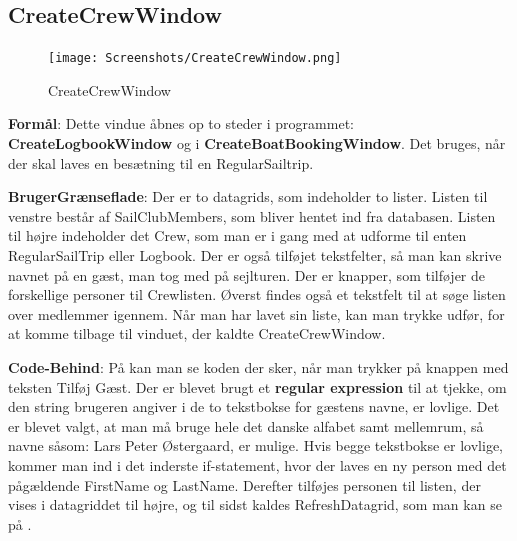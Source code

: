 \subsection{CreateCrewWindow}

\begin{figure}
    \label{img:login_interface}
    \vspace{-20pt}
    \begin{center}
        \texttt{[image: Screenshots/CreateCrewWindow.png]}
    \end{center}
    \vspace{-20pt}
    \caption{CreateCrewWindow}
    \vspace{-30pt}
\end{figure}

\textbf{Formål}: Dette vindue åbnes op to steder i programmet: \textbf{CreateLogbookWindow} og i \textbf{CreateBoatBookingWindow}. Det bruges, når der skal laves en besætning til en RegularSailtrip.  

\textbf{BrugerGrænseflade}: Der er to datagrids, som indeholder to lister. Listen til venstre består af SailClubMembers, som bliver hentet ind fra databasen. Listen til højre indeholder det Crew, som man er i gang med at udforme til enten RegularSailTrip eller Logbook. Der er også tilføjet tekstfelter, så man kan skrive navnet på en gæst, man tog med på sejlturen. Der er knapper, som tilføjer de forskellige personer til Crewlisten. Øverst findes også et tekstfelt til at søge listen over medlemmer igennem. Når man har lavet sin liste, kan man trykke udfør, for at komme tilbage til vinduet, der kaldte CreateCrewWindow.

\textbf{Code-Behind}: 
På  kan man se koden der sker, når man trykker på knappen med teksten Tilføj Gæst.
Der er blevet brugt et \textbf{regular expression} til at tjekke, om den string brugeren angiver i de to tekstbokse for gæstens navne, er lovlige. 
Det er blevet valgt, at man må bruge hele det danske alfabet samt mellemrum, så navne såsom: Lars Peter Østergaard, er mulige.
Hvis begge tekstbokse er lovlige, kommer man ind i det inderste if-statement, hvor der laves en ny person med det pågældende FirstName og LastName. 
Derefter tilføjes personen til listen, der vises i datagriddet til højre, og til sidst kaldes RefreshDatagrid, som man kan se på .

